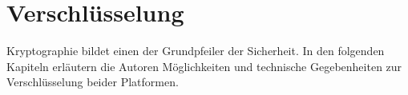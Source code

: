 \section{Verschlüsselung}
	Kryptographie bildet einen der Grundpfeiler der Sicherheit. In den folgenden
	Kapiteln erläutern die Autoren Möglichkeiten und technische Gegebenheiten zur
	Verschlüsselung beider Platformen.